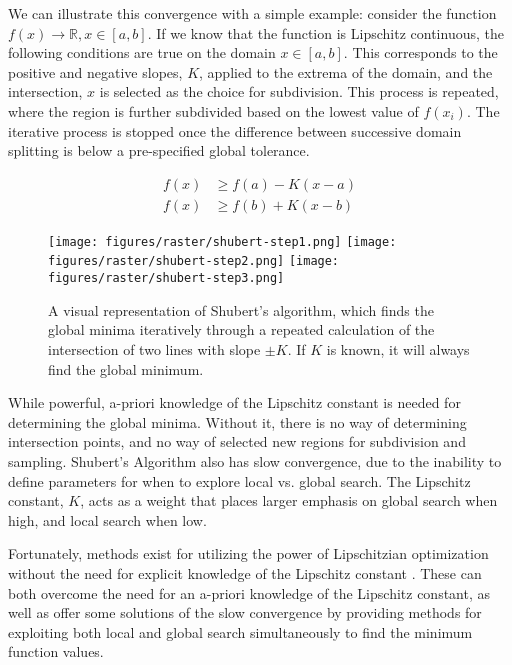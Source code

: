 We can illustrate this convergence with a simple example: consider the function $f(x) \rightarrow \mathbb{R}, x \in [a,b]$. If we know that the function is Lipschitz continuous, the following conditions are true on the domain $x\in[a,b]$. This corresponds to the positive and negative slopes, $K$, applied to the extrema of the domain, and the intersection, $x$ is selected as the choice for subdivision. This process is repeated, where the region is further subdivided based on the lowest value of $f(x_i)$. The iterative process is stopped once the difference between successive domain splitting is below a pre-specified global tolerance. 

\begin{equation}
    \begin{aligned}
        f(x) &\ge f(a) - K(x - a) \\
        f(x) &\ge f(b) + K(x - b)
    \end{aligned}
    \label{eq:shubert}
\end{equation}

\begin{figure}
    \begin{center}
        \texttt{[image: figures/raster/shubert-step1.png]}
        \vspace{3mm}
        \texttt{[image: figures/raster/shubert-step2.png]}
        \vspace{3mm}
        \texttt{[image: figures/raster/shubert-step3.png]}
    \end{center}
    \label{fig:shubert}
    \caption{A visual representation of Shubert's algorithm, which finds the global minima iteratively through a repeated calculation of the intersection of two lines with slope $\pm K$. If $K$ is known, it will always find the global minimum.}
\end{figure}

While powerful, a-priori knowledge of the Lipschitz constant is needed for determining the global minima. Without it, there is no way of determining intersection points, and no way of selected new regions for subdivision and sampling. Shubert's Algorithm also has slow convergence, due to the inability to define parameters for when to explore local vs. global search. The Lipschitz constant, $K$, acts as a weight that places larger emphasis on global search when high, and local search when low.

Fortunately, methods exist for utilizing the power of Lipschitzian optimization without the need for explicit knowledge of the Lipschitz constant \cite{jonesLipschitzianOptimizationLipschitz1993}. These can both overcome the need for an a-priori knowledge of the Lipschitz constant, as well as offer some solutions of the slow convergence by providing methods for exploiting both local and global search simultaneously to find the minimum function values.

